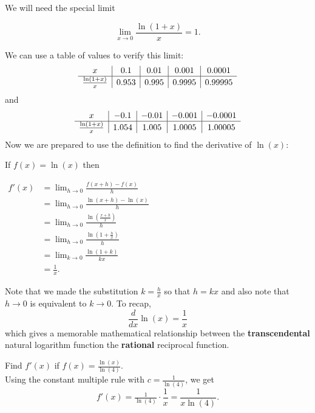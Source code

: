 \documentclass{ximera}
\begin{document}
We will need the special limit 

\[
\lim_{x \to 0} \frac{\ln(1 + x)}{x} = 1.
\]

We can use a table of values to verify this limit:
\[
\begin{array}{ c | c | c | c | c }
  x & 0.1 & 0.01  & 0.001 & 0.0001 \\ 
	\hline
	 \frac{\ln(1+x)}{x} & 0.953 & 0.995 & 0.9995 & 0.99995
\end{array}
\]
and
\[
\begin{array}{ c | c | c | c | c }
  x & -0.1 & -0.01  & -0.001 & -0.0001 \\ 
	\hline
	 \frac{\ln(1+x)}{x} & 1.054 & 1.005 & 1.0005 & 1.00005
\end{array}
\]
Now we are prepared to use the definition to find the derivative of $\ln(x)$:

If $f(x) = \ln(x)$ then\\[10pt]
\begin{center}
$\begin{aligned}
f'(x) &= \lim_{h \to 0} \frac{f(x+h)-f(x)}{h}\\[5pt]
&= \lim_{h \to 0}\frac{\ln(x+h)-\ln(x)}{h}\\[5pt]
&= \lim_{h \to 0} \frac{\ln(\frac{x+h}{x})}{h}\\[5pt]
&= \lim_{h \to 0}\frac{\ln(1 + \frac{h}{x})}{h}\\[5pt]
&= \lim_{k \to 0} \frac{\ln(1 + k)}{kx} \\[5pt]
&= \frac{1}{x}.
\end{aligned}$
\end{center}

Note that we made the substitution $k =\frac{h}{x}$ so that $h = kx$ and  also note 
that $h\to 0$ is equivalent to $k\to 0$.
To recap, 
\[
\frac{d}{dx} \ln(x) = \frac{1}{x}
\]
which gives a memorable mathematical relationship between the \textbf{transcendental} natural logarithm function 
the \textbf{rational} reciprocal function.


\begin{example}[example 2]
 Find $f'(x)$ if $f(x) = \frac{\ln(x)}{\ln(4)}$.\\
 Using the constant multiple rule with $c = \frac{1}{\ln(4)}$, 
 we get 
\[
f'(x) = \tfrac{1}{\ln(4)} \cdot \frac{1}{x} = \frac{1}{x\ln(4)}.
\]
\end{example}
\end{document}
